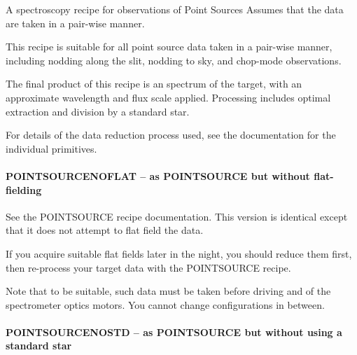 \documentclass[twoside,11pt]{article}
\renewcommand{\_}{\texttt{\symbol{95}}}
\begin{document}
\mbox{}

A spectroscopy recipe for observations of Point Sources
Assumes that the data are taken in a pair-wise manner.



This recipe is suitable for all point source data taken in a pair-wise
manner, including nodding along the slit, nodding to sky, and
chop-mode observations.



The final product of this recipe is an spectrum of the target, with an
approximate wavelength and flux scale applied. Processing includes
optimal extraction and division by a standard star.



For details of the data reduction process used, see the documentation
for the individual primitives.


\paragraph*{POINT\_SOURCE\_NOFLAT -- as POINT\_SOURCE but without flat-fielding\label{POINT_SOURCE_NOFLAT_--_as_POINT_SOURCE_but_without_flat-fielding}}



\mbox{}

See the POINT\_SOURCE recipe documentation. This version is identical except
that it does not attempt to flat field the data.



If you acquire suitable flat fields later in the night, you should
reduce them first, then re-process your target data with the
POINT\_SOURCE recipe.



Note that to be suitable, such data must be taken before driving and
of the spectrometer optics motors. You cannot change configurations
in between.


\paragraph*{POINT\_SOURCE\_NOSTD -- as POINT\_SOURCE but without using a standard star\label{POINT_SOURCE_NOSTD_--_as_POINT_SOURCE_but_without_using_a_standard_star}}
\end{document}

